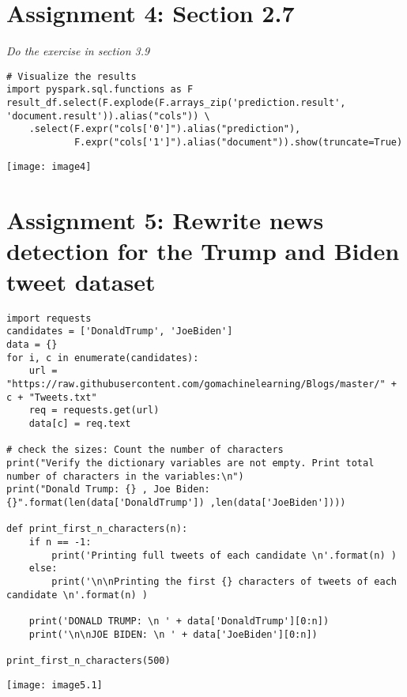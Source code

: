 \documentclass[]{article}
\begin{document}
\section*{Assignment 4: Section 2.7}
\emph{ Do the exercise in section 3.9 }

\begin{verbatim}
# Visualize the results
import pyspark.sql.functions as F
result_df.select(F.explode(F.arrays_zip('prediction.result', 
'document.result')).alias("cols")) \
	.select(F.expr("cols['0']").alias("prediction"),
			F.expr("cols['1']").alias("document")).show(truncate=True)
\end{verbatim}
\texttt{[image: image4]}


\section*{Assignment 5: Rewrite news detection for the Trump and Biden tweet dataset}
\begin{verbatim}
import requests
candidates = ['DonaldTrump', 'JoeBiden']
data = {}
for i, c in enumerate(candidates):
	url = "https://raw.githubusercontent.com/gomachinelearning/Blogs/master/" + c + "Tweets.txt"
	req = requests.get(url)
	data[c] = req.text

# check the sizes: Count the number of characters
print("Verify the dictionary variables are not empty. Print total number of characters in the variables:\n")
print("Donald Trump: {} , Joe Biden: {}".format(len(data['DonaldTrump']) ,len(data['JoeBiden'])))

def print_first_n_characters(n):
	if n == -1:
		print('Printing full tweets of each candidate \n'.format(n) )
	else:
		print('\n\nPrinting the first {} characters of tweets of each candidate \n'.format(n) )
	
	print('DONALD TRUMP: \n ' + data['DonaldTrump'][0:n])  
	print('\n\nJOE BIDEN: \n ' + data['JoeBiden'][0:n])

print_first_n_characters(500)
\end{verbatim}
\texttt{[image: image5.1]} %
\end{document}
